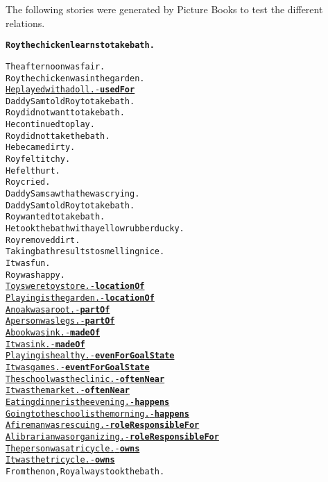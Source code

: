 %
%
%                 

\label{sec:appendixgenerated}

The following stories were generated by Picture Books to test the different relations.

\begin{alltt}
\textbf{Roy the chicken learns to take bath.}

The afternoon was fair.
Roy the chicken was in the garden.
\underline{He played with a doll. - \textbf{usedFor}}
Daddy Sam told Roy to take bath.
Roy did not want to take bath.
He continued to play.
Roy did not take the bath.
He became dirty.
Roy felt itchy.
He felt hurt.
Roy cried.
Daddy Sam saw that he was crying.
Daddy Sam told Roy to take bath.
Roy wanted to take bath.
He took the bath with a yellow rubber ducky.
Roy removed dirt.
Taking bath results to smelling nice.
It was fun.
Roy was happy.
\underline{Toys were toy store. - \textbf{locationOf}}
\underline{Playing is the garden. - \textbf{locationOf}}
\underline{An oak was a root. - \textbf{partOf}}
\underline{A person was legs. - \textbf{partOf}}
\underline{A book was ink. - \textbf{madeOf}}
\underline{It was ink. - \textbf{madeOf}}
\underline{Playing is healthy. - \textbf{evenForGoalState}}
\underline{It was games. - \textbf{eventForGoalState}}
\underline{The school was the clinic. - \textbf{oftenNear}}
\underline{It was the market. - \textbf{oftenNear}}
\underline{Eating dinner is the evening. - \textbf{happens}}
\underline{Going to the school is the morning. - \textbf{happens}}
\underline{A fireman was rescuing. - \textbf{roleResponsibleFor}}
\underline{A librarian was organizing. - \textbf{roleResponsibleFor}}
\underline{The person was a tricycle. - \textbf{owns}}
\underline{It was the tricycle. - \textbf{owns}}
From then on, Roy always took the bath.
\end{alltt}


